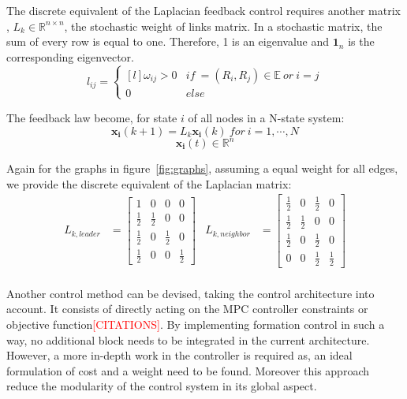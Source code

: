 \documentclass[a4paper, 12pt]{report}
\begin{document}
The discrete equivalent of the Laplacian feedback control requires another matrix \cite{Moreau2005}, $L_k \in \mathbb{R}^{n \times n}$, the stochastic weight of links matrix. In a stochastic matrix, the sum of every row is equal to one. Therefore, 1 is an eigenvalue and $\boldsymbol{1}_n$ is the corresponding eigenvector.
\[l_{ij} =  \left\{ \begin{matrix*}[l] \omega_{ij} > 0 & if\  = (R_i, R_j) \in \mathbb{E}\ or\ i=j\\ 0 & else \end{matrix*} \right.\]

The feedback law become, for state $i$ of all nodes in a N-state system:
\[ \boldsymbol{x_i}(k+1) = L_k\boldsymbol{x_i}(k)\ for\ i=1, \cdots, N \]
\[\boldsymbol{x_i}(t) \in \mathbb{R}^n\]

Again for the graphs in figure~\ref{fig:graphs}, assuming a equal weight for all edges, we provide the discrete equivalent of the Laplacian matrix:
\begin{displaymath}
\begin{aligned}
L_{k,leader} &= \begin{bmatrix} 1 & 0 & 0 & 0 \\ \frac{1}{2} & \frac{1}{2} & 0 & 0 \\ \frac{1}{2} & 0 & \frac{1}{2} & 0 \\ \frac{1}{2} & 0 & 0 & \frac{1}{2}\end{bmatrix} 		& L_{k,neighbor} &= \begin{bmatrix} \frac{1}{2} & 0 & \frac{1}{2} & 0 \\ \frac{1}{2} & \frac{1}{2} & 0 & 0 \\ \frac{1}{2} & 0 & \frac{1}{2} & 0 \\ 0 & 0 & \frac{1}{2} & \frac{1}{2}\end{bmatrix} \\
\end{aligned}
\end{displaymath}

Another control method can be devised, taking the control architecture into account. It consists of directly acting on the MPC controller constraints or objective function\textcolor{red}{[CITATIONS]}.  By implementing formation control in such a way, no additional block needs to be integrated in the current architecture. However, a more in-depth work in the controller is required as, an ideal formulation of cost and a weight need to be found. Moreover this approach reduce the modularity of the control system in its global aspect.
\end{document}
